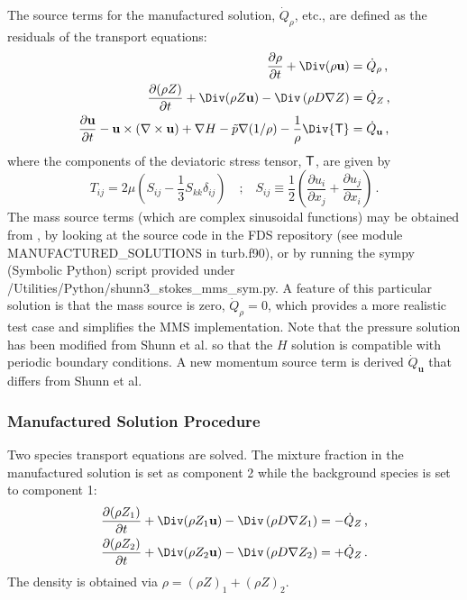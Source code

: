 \documentclass[11pt]{book}
\begin{document}
The source terms for the manufactured solution, $\dot{Q}_\rho$, etc., are defined as the residuals of the transport equations:
\begin{align}
\label{eqn_mms_continuity} \frac{\partial \rho}{\partial t} + \Div(\rho \mathbf{u}) &= \dot{Q}_\rho \,\mbox{,}\\
\frac{\partial (\rho Z)}{\partial t} + \Div(\rho Z \mathbf{u}) - \Div\left(\rho D \nabla Z\right) &= \dot{Q}_Z \,\mbox{,}\\
\frac{\partial \mathbf{u}}{\partial t} - \mathbf{u} \times (\nabla \times \mathbf{u}) + \nabla H - \tilde{p} \nabla(1/\rho) - \frac{1}{\rho}\Div{\sf T} &= \dot{Q}_{\mathbf{u}} \,\mbox{,}
\end{align}
where the components of the deviatoric stress tensor, ${\sf T}$, are given by
\begin{equation}
T_{ij} = 2\mu \left( S_{ij} -  \frac{1}{3} S_{kk} \delta_{ij} \right) \quad\mbox{;}\quad S_{ij} \equiv \frac{1}{2}\left( \frac{\partial u_i}{\partial x_j} + \frac{\partial u_j}{\partial x_i} \right) \,\mbox{.}
\end{equation}
The mass source terms (which are complex sinusoidal functions) may be obtained from \cite{Shunn:2012}, by looking at the source code in the FDS repository \cite{FDS-SMV_repository} (see module {\ct MANUFACTURED\_SOLUTIONS} in {\ct turb.f90}), or by running the sympy (Symbolic Python) script provided under\\
{\ct /Utilities/Python/shunn3\_stokes\_mms\_sym.py}.  A feature of this particular solution is that the mass source is zero, $\dot{Q}_\rho = 0$, which provides a more realistic test case and simplifies the MMS implementation.  Note that the pressure solution has been modified from Shunn et al. \cite{Shunn:2012} so that the $H$ solution is compatible with periodic boundary conditions.  A new momentum source term is derived $\dot{Q}_{\mathbf{u}}$ that differs from Shunn et al.

\subsubsection*{Manufactured Solution Procedure}

Two species transport equations are solved.  The mixture fraction in the manufactured solution is set as component 2 while the background species is set to component 1:
\begin{align}
\label{eqn_fds_species_1} \frac{\partial (\rho Z_1)}{\partial t} + \Div(\rho Z_1 \mathbf{u}) - \Div\left(\rho D \nabla Z_1\right) &= - \dot{Q}_Z \,\mbox{,}\\
\label{eqn_fds_species_2} \frac{\partial (\rho Z_2)}{\partial t} + \Div(\rho Z_2 \mathbf{u}) - \Div\left(\rho D \nabla Z_2\right) &= + \dot{Q}_Z \,\mbox{.}
\end{align}
The density is obtained via $\rho = (\rho Z)_1 + (\rho Z)_2$.
\end{document}

